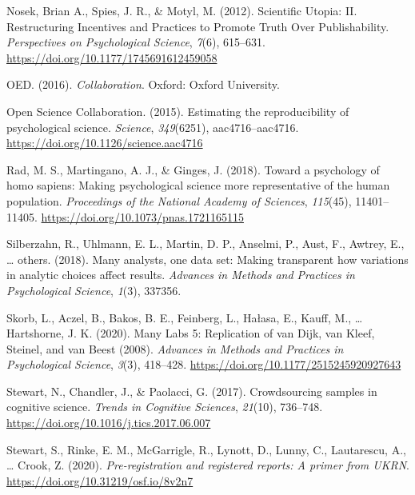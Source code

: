 \documentclass[
  man,floatsintext]{apa6}
\newlength{\cslhangindent}
\newlength{\cslentryspacingunit} %
\newenvironment{CSLReferences}[2] %
 {%
  \setlength{\parindent}{0pt}
  \ifodd #1
  \let\oldpar\par
  \def\par{\hangindent=\cslhangindent\oldpar}
  \fi
  \setlength{\parskip}{#2\cslentryspacingunit}
 }%
 {}
\begin{document}
\begin{CSLReferences}{1}{0}
\leavevmode{}%
Nosek, Brian A., Spies, J. R., \& Motyl, M. (2012). Scientific Utopia: II. Restructuring Incentives and Practices to Promote Truth Over Publishability. \emph{Perspectives on Psychological Science}, \emph{7}(6), 615--631. \url{https://doi.org/10.1177/1745691612459058}

\leavevmode{}%
OED. (2016). \emph{Collaboration}. Oxford: Oxford University.

\leavevmode{}%
Open Science Collaboration. (2015). Estimating the reproducibility of psychological science. \emph{Science}, \emph{349}(6251), aac4716--aac4716. \url{https://doi.org/10.1126/science.aac4716}

\leavevmode{}%
Rad, M. S., Martingano, A. J., \& Ginges, J. (2018). Toward a psychology of homo sapiens: Making psychological science more representative of the human population. \emph{Proceedings of the National Academy of Sciences}, \emph{115}(45), 11401--11405. \url{https://doi.org/10.1073/pnas.1721165115}

\leavevmode{}%
Silberzahn, R., Uhlmann, E. L., Martin, D. P., Anselmi, P., Aust, F., Awtrey, E., \ldots{} others. (2018). Many analysts, one data set: Making transparent how variations in analytic choices affect results. \emph{Advances in Methods and Practices in Psychological Science}, \emph{1}(3), 337356.

\leavevmode{}%
Skorb, L., Aczel, B., Bakos, B. E., Feinberg, L., Hałasa, E., Kauff, M., \ldots{} Hartshorne, J. K. (2020). Many Labs 5: Replication of van Dijk, van Kleef, Steinel, and van Beest (2008). \emph{Advances in Methods and Practices in Psychological Science}, \emph{3}(3), 418--428. \url{https://doi.org/10.1177/2515245920927643}

\leavevmode{}%
Stewart, N., Chandler, J., \& Paolacci, G. (2017). Crowdsourcing samples in cognitive science. \emph{Trends in Cognitive Sciences}, \emph{21}(10), 736--748. \url{https://doi.org/10.1016/j.tics.2017.06.007}

\leavevmode{}%
Stewart, S., Rinke, E. M., McGarrigle, R., Lynott, D., Lunny, C., Lautarescu, A., \ldots{} Crook, Z. (2020). \emph{Pre-registration and registered reports: A primer from UKRN}. \url{https://doi.org/10.31219/osf.io/8v2n7}


\end{CSLReferences}
\end{document}
